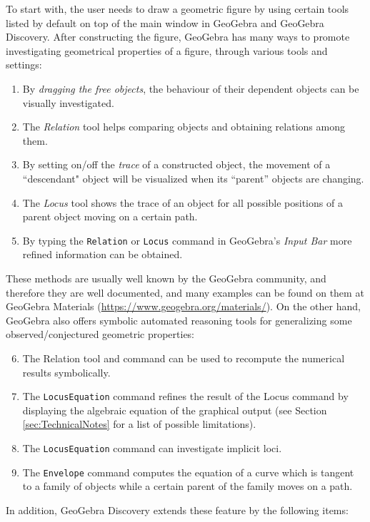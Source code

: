 \documentclass{article}
\begin{document}
To start with,  the user needs to draw a geometric figure by using certain tools listed by default on top of the main window in GeoGebra and
GeoGebra Discovery. After constructing the figure, GeoGebra has many ways to promote investigating geometrical properties of a figure,  through various tools and settings:
\begin{enumerate}
    \item By \textit{dragging the free objects}, the behaviour of their dependent objects can be visually investigated.
    \item The \textit{Relation} tool helps comparing objects and obtaining relations among them.
    \item By setting on/off the \textit{trace} of a constructed object,  the movement of a ``descendant" object will be visualized when its ``parent'' objects are changing.
    \item The \textit{Locus} tool shows the trace of an object for all possible positions of a parent object moving on a certain path.
    \item By typing the \texttt{Relation} or \texttt{Locus} command in GeoGebra's \textit{Input Bar} more refined information can be obtained.
\end{enumerate}
These methods are usually well known by the GeoGebra community, and therefore they are well documented, and many examples can be found on them at GeoGebra Materials (\url{https://www.geogebra.org/materials/}). On the other hand, GeoGebra also offers symbolic automated reasoning tools for generalizing some observed/conjectured geometric properties:
\begin{enumerate}
\setcounter{enumi}{5}
    \item The Relation tool and command can be used to recompute the numerical results symbolically.
    \item The \texttt{LocusEquation} command refines the result of the Locus command by displaying the algebraic equation of the graphical output (see Section \ref{sec:TechnicalNotes} for a list of possible
limitations).
    \item The \texttt{LocusEquation} command can investigate implicit loci.
    \item The \texttt{Envelope} command computes the equation of a curve which is tangent to a family of objects while a certain parent of the family moves on a path.
\end{enumerate}
In addition, GeoGebra Discovery extends these feature by the following items:
\end{document}
